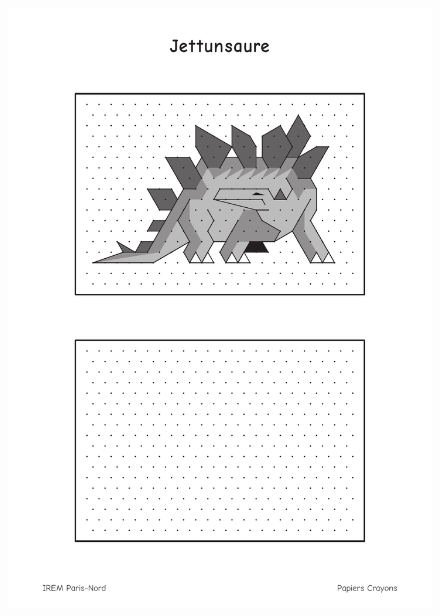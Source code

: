 \begin{figure}[H]
  \centering
  \includegraphics[width=0.95\linewidth]{6xDM/jettunsaure.pdf}
\end{figure}






